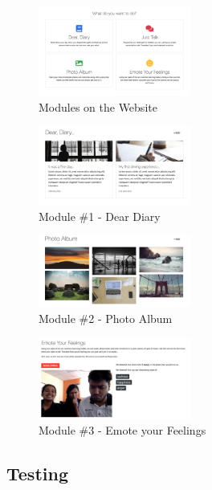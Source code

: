 \documentclass[conference,compsoc]{IEEEtran}
\begin{document}
\begin{figure}[H]
    \centering
    \includegraphics[width=5cm]{images/screenshots/website/website-modules.png}
    \caption{Modules on the Website}
\end{figure}

\begin{figure}[H]
    \centering
    \includegraphics[width=5cm]{images/screenshots/website/website-dear-diary.png}
    \caption{Module \#1 - Dear Diary}
\end{figure}

\begin{figure}[H]
    \centering
    \includegraphics[width=5cm]{images/screenshots/website/website-photo-album.png}
    \caption{Module \#2 - Photo Album}
\end{figure}

\begin{figure}[H]
    \centering
    \includegraphics[width=5cm]{images/screenshots/website/website-emote-feelings.png}
    \caption{Module \#3 - Emote your Feelings}
\end{figure}

\subsection{Testing}
\end{document}
